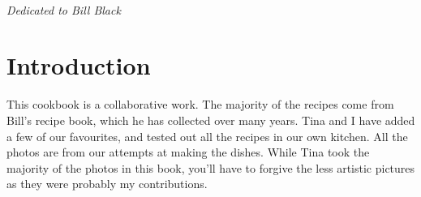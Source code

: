 \documentclass{tufte-book}
\begin{document}
\cleardoublepage
\tableofcontents


\cleardoublepage
~\vfill
\begin{doublespace}
\noindent\fontsize{18}{22}\selectfont\itshape
\nohyphenation
Dedicated to Bill Black
\end{doublespace}
\vfill
\vfill


\cleardoublepage
\chapter*{Introduction}

This cookbook is a collaborative work. The majority of the recipes come from Bill's recipe book, which he has collected over many years. Tina and I have added a few of our favourites, and tested out all the recipes in our own kitchen. All the photos are from our attempts at making the dishes. While Tina took the majority of the photos in this book, you'll have to forgive the less artistic pictures as they were probably my contributions.




\mainmatter
\end{document}
